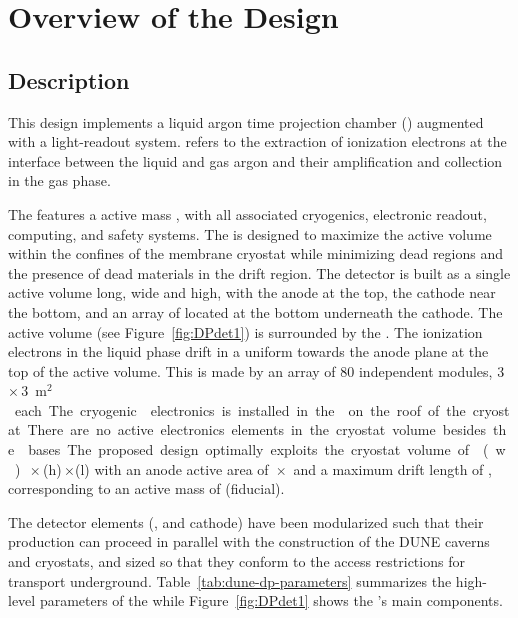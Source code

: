 \chapter{Overview of the \dpmod Design}
\label{ch:fddp-ov}

\section{Description}
\label{sec:fddp-ov-description}

This \dual design implements a \dual liquid argon time projection chamber (\lartpc) augmented with a light-readout system.  \textit{\dual} refers to the extraction of ionization electrons at the interface between the liquid and gas argon and their amplification and collection in the gas phase.

The  features a  \dpactivelarmass active mass \lartpc, with all associated cryogenics, electronic readout, computing, and safety systems. The  is designed to maximize the active volume within the confines of the membrane cryostat while minimizing dead regions and the presence of dead materials in the drift region. The detector is built as a single active volume \dptpclen long, \dptpcwdth wide and \tpcheight high, with the anode at the top, the cathode near the bottom, and an array of  located  at the bottom %
underneath the cathode. The active volume (see Figure~\ref{fig:DPdet1}) is surrounded by the . The ionization electrons in the liquid phase drift  in a uniform \efield towards the anode plane at the top of the active volume. This is made by an array of \num{80} independent  modules, \num{3}\,$\times$\,\SI{3}{m$^2$} each. The cryogenic  electronics is %
installed in the 
on the roof of the cryostat. There are no active electronics elements in the cryostat volume besides the  bases.
The proposed design optimally exploits the cryostat volume of \cryostatwdth{}(w)\,$\times$\,\cryostatht{}(h)\,$\times$\cryostatlen{}(l) with an anode active area of \dptpcwdth{}\,$\times$\,\cryostatlen{} and a maximum drift length of \dpmaxdrift{}, corresponding to an active \lar mass of \dpactivelarmass  (\dpfidlarmass fiducial). 

The detector elements (,  and cathode) have been modularized such that their production can proceed in parallel with the construction of the DUNE caverns and cryostats, and sized so that they conform to the access restrictions for transport underground. Table~\ref{tab:dune-dp-parameters} summarizes %
the high-level parameters of the  while Figure~\ref{fig:DPdet1} shows %
the 's main components.

